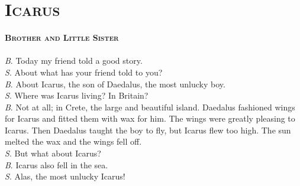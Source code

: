 \documentclass[12pt]{article}
\begin{document}
\section{\textsc{Icarus}}
\textsc{\textbf{Brother and Little Sister}} \\ \\
\textsc{\textit{B}}. Today my friend told a good story. \\
\textsc{\textit{S}}. About what has your friend told to you? \\
\textsc{\textit{B}}. About Icarus, the son of Daedalus, the most unlucky boy. \\
\textsc{\textit{S}}. Where was Icarus living? In Britain? \\
\textsc{\textit{B}}. Not at all; in Crete, the large and beautiful island. Daedalus fashioned wings for Icarus and fitted them with wax for him. The wings were greatly pleasing to Icarus. Then Daedalus taught the boy to fly, but Icarus flew too high. The sun melted the wax and the wings fell off. \\
\textsc{\textit{S}}. But what about Icarus? \\
\textsc{\textit{B}}. Icarus also fell in the sea. \\
\textsc{\textit{S}}. Alas, the most unlucky Icarus!
\end{document}
